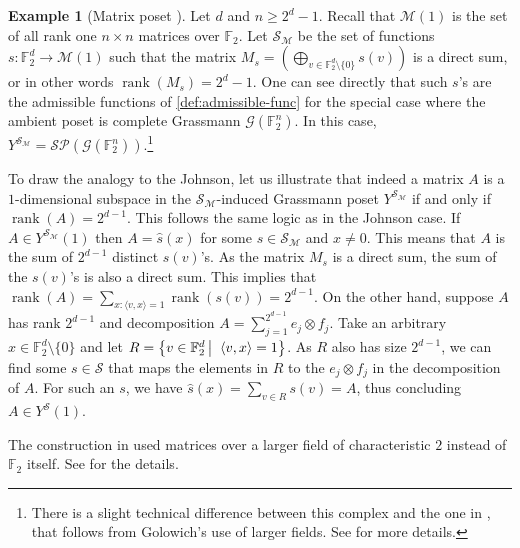 \documentclass[10pt,a4paper]{article}
\newcommand{\prettyref}[1]{\cref{#1}}
\theoremstyle{definition}
\newtheorem{example}[theorem]{Example}
\theoremstyle{remark}
\newcommand\sett[2]{\left\{ #1 \left| \; \vphantom{#1 #2} \right. #2  \right\}}
\newcommand{\set}[1]{\{#1\}}
\newcommand{\iprod}[1]{\langle#1\rangle}
\newcommand{\F}{\mathbb{F}}
\DeclareMathOperator{\rank}{rank}
\renewcommand{\geq}{\geqslant}
\numberwithin{equation}{section}
\let\pref=\prettyref
\def\Y{Y}
\def\M{\mathcal{SP}}
\def\MP{\mathcal{M}}
\begin{document}
\begin{example}[Matrix poset {\cite{Golowich2023}}] \label{ex:matrices}
    Let \(d\) and \(n \geq 2^d-1\). Recall that \(\MP(1)\) is the set of all rank one \(n \times n\) matrices over \(\F_2\). Let \(\mathcal{S}_{\MP}\) be the set of functions \(s:\F_2^d \to \MP(1)\) such that the matrix \(M_s = \left (\bigoplus_{v \in \F_2^d \setminus \set{0}}s(v) \right )\) is a direct sum, or in other words \(\rank(M_s) = 2^d - 1\). One can see directly that such \(s\)'s are the admissible functions of \pref{def:admissible-func} for the special case where the ambient poset is complete Grassmann \(\mathcal{G}(\F_2^n)\). In this case, \(\Y^{\mathcal{S}_{\MP}} = \M(\mathcal{G}(\F_2^n))\).\footnote{There is a slight technical difference between this complex and the one in \cite{Golowich2023}, that follows from Golowich's use of larger fields. See \cite{Golowich2023} for more details.}
    
    To draw the analogy to the Johnson, let us illustrate that indeed a matrix \(A\) is a $1$-dimensional subspace in the $\mathcal{S}_{\MP}$-induced Grassmann poset \(Y^{\mathcal{S}_{\MP}}\) if and only if \(\rank(A) = 2^{d-1}\). This follows the same logic as in the Johnson case. If \(A \in \Y^{\mathcal{S}_{\MP}}(1)\) then \(A = \widehat{s}(x)\) for some \(s \in \mathcal{S}_{\MP}\) and \(x\ne 0\). This means that \(A\) is the sum of \(2^{d-1}\) distinct \(s(v)\)'s. As the matrix \(M_s\) is a direct sum, the sum of the \(s(v)\)'s is also a direct sum. This implies that \(\rank(A) = \sum_{x: \iprod{v,x}=1}\rank(s(v)) = 2^{d-1}\). On the other hand, suppose \(A\) has rank \(2^{d-1}\) and decomposition \(A = \sum_{j=1}^{2^{d-1}} e_j \otimes f_j\). Take an arbitrary \(x \in \F_2^d \setminus \set{0}\) and let \(R = \sett{v \in \F_2^d}{\iprod{v,x}=1}\). As \(R\) also has size \(2^{d-1}\), we can find some \(s \in \mathcal{S}\) that maps the elements in \(R\) to the \(e_j \otimes f_j\) in the decomposition of \(A\). For such an \(s\), we have \(\widehat{s}(x) = \sum_{v \in R}s(v) = A\), thus concluding \(A \in \Y^{\mathcal{S}}(1)\).
\end{example}
The construction in \cite{Golowich2023} used matrices over a larger field of characteristic \(2\) instead of \(\F_2\) itself. See \cite{Golowich2023} for the details.
\end{document}
